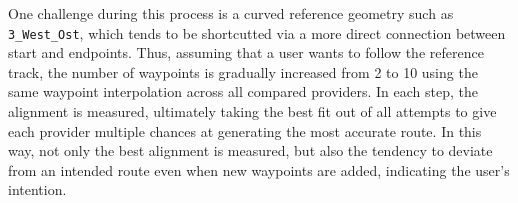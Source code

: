 One challenge during this process is a curved reference geometry such as \texttt{3\_West\_Ost}, which tends to be shortcutted via a more direct connection between start and endpoints. Thus, assuming that a user wants to follow the reference track, the number of waypoints is gradually increased from 2 to 10 using the same waypoint interpolation across all compared providers. In each step, the alignment is measured, ultimately taking the best fit out of all attempts to give each provider multiple chances at generating the most accurate route. In this way, not only the best alignment is measured, but also the tendency to deviate from an intended route even when new waypoints are added, indicating the user's intention.

\begin{table}[t]
\centering
{}
\end{table}
